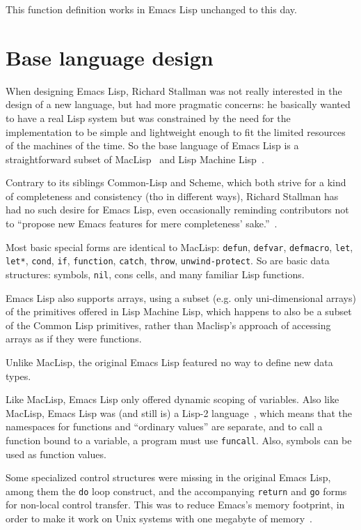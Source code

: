 \documentclass[format=acmsmall, review]{acmart}
\newcommand \Elisp {Emacs Lisp}
\begin{document}
This function definition works in \Elisp{} unchanged to this day.

\section{Base language design}
\label{sec:base-language-design}

When designing \Elisp{}, Richard Stallman was not really interested in the
design of a new language, but had more pragmatic concerns: he basically
wanted to have a real Lisp system but was constrained by the need for the
implementation to be simple and lightweight enough to fit the limited
resources of the machines of the time.  So the base language of \Elisp{} is
a straightforward subset of MacLisp~\cite{Moon1974,Pitman1983} and Lisp
Machine Lisp~\cite{WeinrebMoon1981}.

Contrary to its siblings Common-Lisp and Scheme, which both strive for
a kind of completeness and consistency (tho in different ways),
Richard Stallman has
had no such desire for \Elisp, even occasionally reminding contributors
not to ``propose new Emacs features for mere completeness'
sake.''~\cite{RMS-completeness}.

Most basic special forms are identical to MacLisp: \texttt{defun},
\texttt{defvar}, \texttt{defmacro}, \texttt{let}, \texttt{let*},
\texttt{cond}, \texttt{if}, \texttt{function}, \texttt{catch}, \texttt{throw},
\texttt{unwind-protect}.  So are basic data structures: symbols,
\texttt{nil}, cons cells, and many familiar Lisp functions.

\Elisp{} also supports arrays, using a subset (e.g. only uni-dimensional
arrays) of the primitives offered in Lisp Machine Lisp, which happens to
also be a subset of the Common Lisp primitives, rather than Maclisp's
approach of accessing arrays as if they were functions.

Unlike MacLisp, the original \Elisp{} featured no way to define new
data types.


Like MacLisp, \Elisp{} only offered
dynamic scoping of variables.  Also like MacLisp, \Elisp{} was (and still is) a Lisp-2
language~\cite{SteeleGabriel1993}, which means that the namespaces for
functions and ``ordinary values'' are separate, and to call a function bound
to a variable, a program must use \texttt{funcall}.  Also, symbols can be
used as function values.

Some specialized control structures were missing in the original
\Elisp{}, among them the \texttt{do} loop construct, and the
accompanying \texttt{return} and \texttt{go} forms for non-local
control transfer.  This was to reduce Emacs's memory footprint, in
order to make it work on Unix systems with one megabyte of memory~\cite{Stallman2018-personal}.
\end{document}
